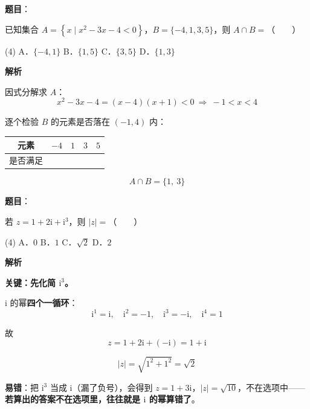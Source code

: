 \begin{answer}

\textbf{题目}：

已知集合 $A=\left\{x\mid x^{2}-3x-4<0\right\}$，$B=\{-4,1,3,5\}$，则 $A\cap B=$\mbox{（　　）}

\begin{gkopts}(4)
\task A．$\{-4,1\}$
\task B．$\{1,5\}$
\task C．$\{3,5\}$
\task D．$\{1,3\}$
\end{gkopts}

\textbf{解析}

因式分解求 $A$：
\nopagebreak[4]
\[x^{2}-3x-4=(x-4)(x+1)<0\ \Longrightarrow\ -1<x<4\]

逐个检验 $B$ 的元素是否落在 $(-1,4)$ 内：

\begin{center}
\begin{tabular}{ccccc}
\toprule
元素 & $-4$ & $1$ & $3$ & $5$ \\
\midrule
是否满足 &  &  &  &  \\
\bottomrule
\end{tabular}
\end{center}

\nopagebreak[4]
\[A\cap B=\{1,\ 3\}\]


\par\medskip

\end{answer}
\begin{answer}

\textbf{题目}：

若 $z=1+2\mathrm i+\mathrm i^{3}$，则 $|z|=$\mbox{（　　）}

\begin{gkopts}(4)
\task A．$0$
\task B．$1$
\task C．$\sqrt2$
\task D．$2$
\end{gkopts}

\textbf{解析}

\textbf{关键：先化简 $\mathrm i^{3}$。}

$\mathrm i$ 的幂\textbf{四个一循环}：
\nopagebreak[4]
\[\mathrm i^{1}=\mathrm i,\quad \mathrm i^{2}=-1,\quad \mathrm i^{3}=-\mathrm i,\quad \mathrm i^{4}=1\]

故
\nopagebreak[4]
\[z=1+2\mathrm i+(-\mathrm i)=1+\mathrm i\]

\nopagebreak[4]
\[|z|=\sqrt{1^{2}+1^{2}}=\sqrt2\]

\begin{gktip}
\textbf{易错}：把 $\mathrm i^{3}$ 当成 $\mathrm i$（漏了负号），会得到 $z=1+3\mathrm i$，$|z|=\sqrt{10}$，不在选项中——\textbf{若算出的答案不在选项里，往往就是 $\mathrm i$ 的幂算错了}。
\end{gktip}


\par\medskip

\end{answer}
